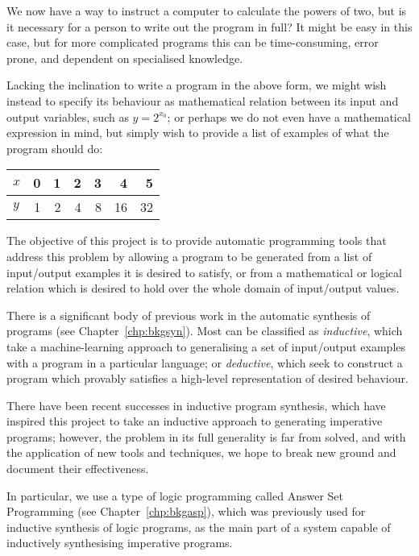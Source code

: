 \documentclass[a4paper,twoside,notitlepage]{report}
\begin{document}
We now have a way to instruct a computer to calculate the powers of two, 
but is it necessary for a person to write out the program in full? It 
might be easy in this case, but for more complicated programs this can be 
time-consuming, error prone, and dependent on specialised knowledge.

Lacking the inclination to write a program in the above form, we might 
wish instead to specify its behaviour as mathematical relation between 
its input and output variables, such as $y = 2^{x_0}$; or perhaps we do not 
even have a mathematical expression in mind, but simply wish to provide a 
list of examples of what the program should do:
\begin{center}
\begin{tabular}{| l || r | r | r | r | r | r |}
    \hline
    $x$ & 0 & 1 & 2 & 3 & 4  &  5 \\
    \hline
    $y$ & 1 & 2 & 4 & 8 & 16 & 32 \\
    \hline
\end{tabular}
\end{center}

The objective of this project is to provide automatic programming tools 
that address this problem by allowing a program to be generated from a 
list of input/output examples it is desired to satisfy, or from a 
mathematical or logical relation which is desired to hold over the whole 
domain of input/output values.

There is a significant body of previous work in the automatic synthesis of 
programs (see Chapter~\ref{chp:bkgsyn}). Most can be classified as 
\emph{inductive}, which take a machine-learning approach to generalising a set 
of input/output examples with a program in a particular language; or 
\emph{deductive}\cite{cheatham86}\cite{bundy90}\cite{colon05}, which seek to 
construct a program which provably satisfies a high-level representation of 
desired behaviour.

There have been recent successes in inductive program synthesis\cite{tds}, 
which have inspired this project to take an inductive approach to generating 
imperative programs; however, the problem in its full generality is far from 
solved, and with the application of new tools and techniques, we hope to break 
new ground and document their effectiveness.

In particular, we use a type of logic programming called Answer Set 
Programming (see Chapter~\ref{chp:bkgasp}), which was previously used for 
inductive synthesis of logic programs, as the main part of a system 
capable of inductively synthesising imperative programs.
\end{document}
